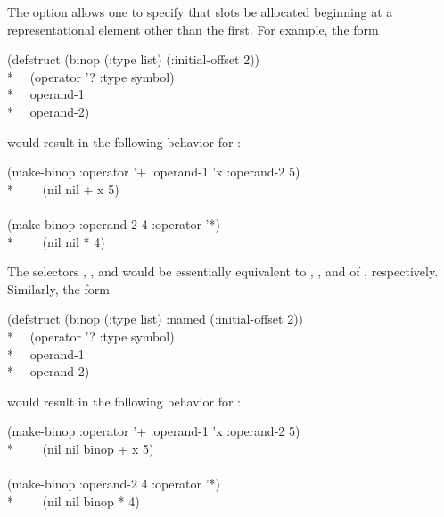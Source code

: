 The  option allows one
to specify that slots be allocated beginning at a representational
element other than the first.  For example, the form
\begin{lisp}
(defstruct (binop (:type list) (:initial-offset 2)) \\*
~~(operator '? :type symbol) \\*
~~operand-1 \\*
~~operand-2)
\end{lisp}
would result in the following behavior for :
\begin{lisp}
(make-binop :operator '+ :operand-1 'x :operand-2 5) \\*
~~~\EV\ (nil nil + x 5) \\
\\
(make-binop :operand-2 4 :operator '*) \\*
~~~\EV\ (nil nil * {\nil} 4)
\end{lisp}
The selectors
, ,
and  would be essentially equivalent to ,
, and  of , respectively.
Similarly, the form
\begin{lisp}
(defstruct (binop (:type list) :named (:initial-offset 2)) \\*
~~(operator '? :type symbol) \\*
~~operand-1 \\*
~~operand-2)
\end{lisp}
would result in the following behavior for :
\begin{lisp}
(make-binop :operator '+ :operand-1 'x :operand-2 5) \\*
~~~\EV\ (nil nil binop + x 5) \\
\\
(make-binop :operand-2 4 :operator '*) \\*
~~~\EV\ (nil nil binop * {\nil} 4)
\end{lisp}

